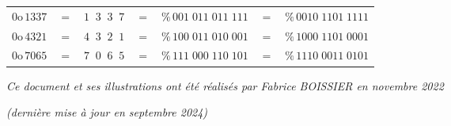 \documentclass[11pt,a4paper]{article}
\begin{document}
\begin{tabular}{l c c c c c c}
$ 0\text{o} \, 1337 $  &  $ = $  & $ 1 \; \; 3 \; \;  3 \; \;  7 $ & $ = $ & $ \% \, 001 \; 011 \; 011 \; 111 $ &
                                                                     $ = $ & $ \% \, 0010 \; 1101 \; 1111 $  \\
$ 0\text{o} \, 4321 $  &  $ = $  & $ 4 \; \; 3 \; \;  2 \; \;  1 $ & $ = $ & $ \% \, 100 \; 011 \; 010 \; 001 $ &
                                                                     $ = $ & $ \% \, 1000 \; 1101 \; 0001 $  \\
$ 0\text{o} \, 7065 $  &  $ = $  & $ 7 \; \; 0 \; \;  6 \; \;  5 $ & $ = $ & $ \% \, 111 \; 000 \; 110 \; 101 $ &
                                                                     $ = $ & $ \% \, 1110 \; 0011 \; 0101 $  \\
\end{tabular}

\bigskip



\vfillFirst

\vfillLast

\begin{center}
\textit{Ce document et ses illustrations ont été réalisés par Fabrice BOISSIER en novembre 2022}

\textit{(dernière mise à jour en septembre 2024)}
\end{center}
\end{document}
